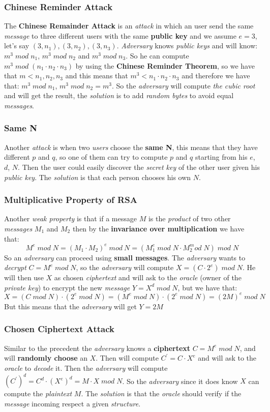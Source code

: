 \documentclass{article}
\begin{document}
\subsubsection{Chinese Reminder Attack}
The \textbf{Chinese Remainder Attack} is an \emph{attack} in which an user send the same \emph{message} to three different users with the same \textbf{public key} and we assume $e=3$, let's say $(3,n_1),(3,n_2),(3,n_3)$. \emph{Adversary} knows \emph{public keys} and will know: $m^3 \; mod \; n_1$,  $m^3 \; mod \; n_2$ and  $m^3 \; mod \; n_3$. So he can compute $m^3\; mod\; (n_1 \cdot n_2 \cdot n_3)$ by using the \textbf{Chinese Reminder Theorem}, so we have that $m<n_1, n_2, n_3$ and this means that $m^3 < n_1 \cdot n_2 \cdot n_3$ and therefore we have that:  $m^3 \; mod \; n_1$,  $m^3 \; mod \; n_2 = m^3$. So the \emph{adversary} will compute \emph{the cubic root} and will get the result, the \emph{solution} is to add \emph{random bytes} to avoid equal \emph{messages}. 
\subsubsection{Same N}
Another \emph{attack} is when two \emph{users} choose the \textbf{same N}, this means that they have different $p$ and $q$, so one of them can try to compute $p$ and $q$ starting from his $e$, $d$, $N$. Then the user could easily discover the \emph{secret key} of the other user given his \emph{public key}. The \emph{solution} is that each person chooses his own $N$.   
\subsubsection{Multiplicative Property of RSA}
Another \emph{weak property} is that if a message $M$ is the \emph{product} of two other \emph{messages} $M_1$ and $M_2$ then by the \textbf{invariance over multiplication} we have that: 
\[ M^e\; mod\; N = (M_1 \cdot M_2)^e\; mod\: N = (M_1^e\; mod\; N \cdot M_2^mod\; N)\; mod\; N\]
So an \emph{adversary} can proceed using \textbf{small messages}. The \emph{adversary} wants to \emph{decrypt} $C=M^e\; mod\; N$, so the \emph{adversary} will compute $X = (C \cdot 2^e)\; mod\; N$. He will then use $X$ as chosen \emph{ciphertext} and will ask to the \emph{oracle} (owner of the \emph{private key}) to encrypt the new \emph{message} $Y=X^d\; mod\; N$, but we have that: 
\[ X = (C\; mod\; N)\cdot(2^e \; mod\;  N) = (M^e \; mod\;  N) \cdot (2^e \; mod\; N) = (2M)^e \; mod\; N\]
But this means that the \emph{adversary} will get $Y= 2M$ 
\subsubsection{Chosen Ciphertext Attack}
Similar to the precedent the \emph{adversary} knows a \textbf{ciphertext} $C= M^e \; mod\; N$, and will \textbf{randomly choose} an $X$. Then will compute $C^{'} = C \cdot X^e$ and will ask to the \emph{oracle} to \emph{decode} it. Then the \emph{adversary} will compute $(C^{'})^d = C^d \cdot (X^e)^d = M \cdot X \; mod\; N$. So the \emph{adversary} since it does know $X$ can compute the \emph{plaintext} $M$. The \emph{solution} is that the \emph{oracle} should verify if the \emph{message} incoming respect a given \emph{structure}.
\end{document}
